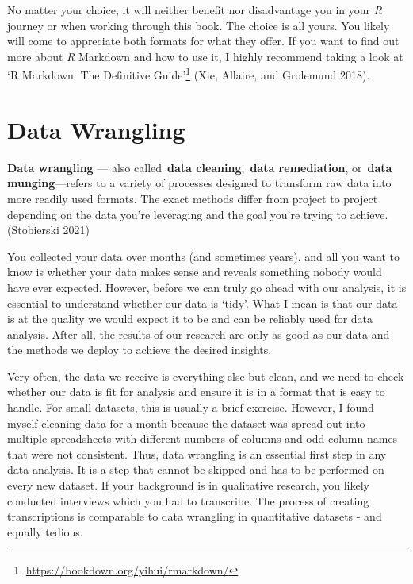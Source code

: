 \documentclass[
  letterpaper,
]{krantz}
\renewenvironment{quote}{\begin{VF}}{\end{VF}}
\renewcommand{\href}[2]{#2\footnote{\url{#1}}}
\begin{document}
No matter your choice, it will neither benefit nor disadvantage you in
your \emph{R} journey or when working through this book. The choice is
all yours. You likely will come to appreciate both formats for what they
offer. If you want to find out more about \emph{R} Markdown and how to
use it, I highly recommend taking a look at
\href{https://bookdown.org/yihui/rmarkdown/}{`R Markdown: The Definitive
Guide'} (Xie, Allaire, and Grolemund 2018).


\chapter{Data Wrangling}\label{data-wrangling}

\begin{quote}
\textbf{Data wrangling} --- also called~\textbf{data
cleaning},~\textbf{data remediation}, or~\textbf{data munging}---refers
to a variety of processes designed to transform raw data into more
readily used formats. The exact methods differ from project to project
depending on the data you're leveraging and the goal you're trying to
achieve. (Stobierski 2021)
\end{quote}

You collected your data over months (and sometimes years), and all you
want to know is whether your data makes sense and reveals something
nobody would have ever expected. However, before we can truly go ahead
with our analysis, it is essential to understand whether our data is
`tidy'. What I mean is that our data is at the quality we would expect
it to be and can be reliably used for data analysis. After all, the
results of our research are only as good as our data and the methods we
deploy to achieve the desired insights.

Very often, the data we receive is everything else but clean, and we
need to check whether our data is fit for analysis and ensure it is in a
format that is easy to handle. For small datasets, this is usually a
brief exercise. However, I found myself cleaning data for a month
because the dataset was spread out into multiple spreadsheets with
different numbers of columns and odd column names that were not
consistent. Thus, data wrangling is an essential first step in any data
analysis. It is a step that cannot be skipped and has to be performed on
every new dataset. If your background is in qualitative research, you
likely conducted interviews which you had to transcribe. The process of
creating transcriptions is comparable to data wrangling in quantitative
datasets - and equally tedious.
\end{document}

